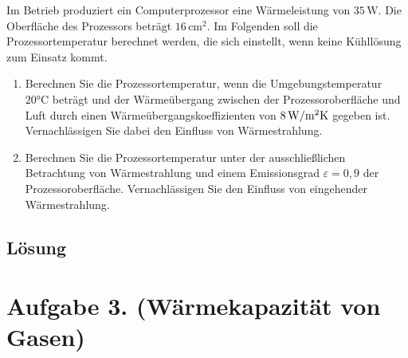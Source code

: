 \documentclass[german,12pt]{homework}
\begin{document}
    \begin{problem}
        Im Betrieb produziert ein Computerprozessor eine Wärmeleistung von
        \(35\,\si{\watt}\). Die Oberfläche des Prozessors beträgt
        \(16\,\si{\centi\meter\squared}\). Im Folgenden soll die
        Prozessortemperatur berechnet werden, die sich einstellt, wenn keine
        Kühllösung zum Einsatz kommt.
        \begin{enumerate}
            \item Berechnen Sie die Prozessortemperatur, wenn die
            Umgebungstemperatur \(20\si{\degreeCelsius}\) beträgt und der
            Wärmeübergang zwischen der Prozessoroberfläche und Luft durch einen
            Wärmeübergangskoeffizienten von
            \(8\,\si{\watt\per{\meter\squared\kelvin}}\) gegeben ist.
            Vernachlässigen Sie dabei den Einfluss von Wärmestrahlung.
            \item Berechnen Sie die Prozessortemperatur unter der
            ausschließlichen Betrachtung von Wärmestrahlung und einem
            Emissionsgrad \(\varepsilon = 0,9\) der Prozessoroberfläche.
            Vernachlässigen Sie den Einfluss von eingehender Wärmestrahlung.
        \end{enumerate}
    \end{problem}

    \subsection*{Lösung}

    \section*{Aufgabe 3. (Wärmekapazität von Gasen)}
\end{document}
